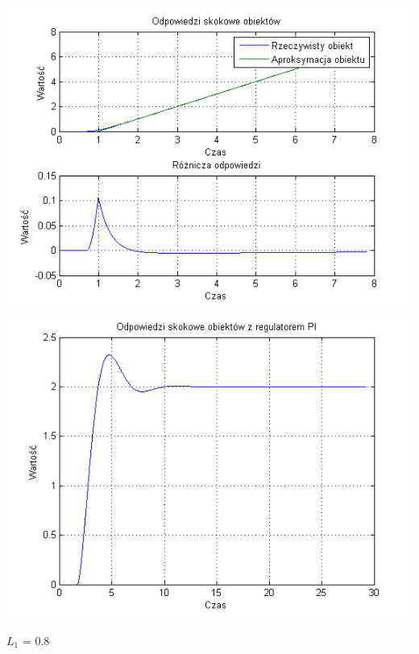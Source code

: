 \documentclass[10pt,a4paper]{article}
\begin{document}
\begin{center}
\includegraphics[scale=1]{images/jeden/skrypt_147.png}\\
\includegraphics[scale=1]{images/jeden/skrypt_148.png}\\
\end{center}
\newpage
$L_1$ = 0.8
\end{document}
